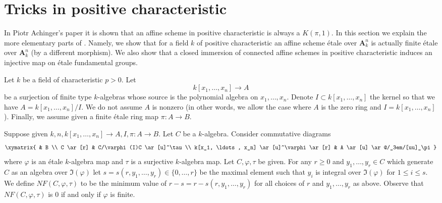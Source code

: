 \section{Tricks in positive characteristic}
\label{section-achinger}

\noindent
In Piotr Achinger's paper \cite{Achinger} it is shown that an
affine scheme in positive characteristic is always a $K(\pi, 1)$.
In this section we explain the more elementary parts of \cite{Achinger}.
Namely, we show that for a field $k$ of positive characteristic
an affine scheme \'etale over $\mathbf{A}^n_k$ is actually finite \'etale
over $\mathbf{A}^n_k$ (by a different morphism). We also show
that a closed immersion of connected affine schemes
in positive characteristic induces an injective map on
\'etale fundamental groups.

\medskip\noindent
Let $k$ be a field of characteristic $p > 0$.
Let
$$
k[x_1, \ldots, x_n] \longrightarrow A
$$
be a surjection of finite type $k$-algebras whose source is the
polynomial algebra on $x_1, \ldots, x_n$. Denote
$I \subset k[x_1, \ldots, x_n]$ the kernel so that we have
$A = k[x_1, \ldots, x_n]/I$. We do not assume $A$ is nonzero
(in other words, we allow the case where $A$ is the zero ring
and $I = k[x_1, \ldots, x_n]$). Finally, we assume given a
finite \'etale ring map $\pi : A \to B$.

\medskip\noindent
Suppose given $k, n, k[x_1, \ldots, x_n] \to A, I, \pi : A \to B$.
Let $C$ be a $k$-algebra. Consider
commutative diagrams
$$
\xymatrix{
& B \\
C \ar[r] & C/\varphi(I)C \ar[u]^\tau \\
k[x_1, \ldots, x_n] \ar[u]^\varphi \ar[r] &
A \ar[u] \ar@/_3em/[uu]_\pi
}
$$
where $\varphi$ is an \'etale $k$-algebra map and $\tau$ is a
surjective $k$-algebra map.
Let $C, \varphi, \tau$ be given. For any $r \geq 0$ and
$y_1, \ldots, y_r \in C$ which generate $C$ as an algebra over
$\Im(\varphi)$ let $s = s(r, y_1, \ldots, y_r) \in \{0, \ldots, r\}$
be the maximal element such that $y_i$ is integral over $\Im(\varphi)$
for $1 \leq i \leq s$. We define $NF(C, \varphi, \tau)$
to be the minimum value of
$r - s = r - s(r, y_1, \ldots, y_r)$ for all choices of
$r$ and $y_1, \ldots, y_r$ as above.
Observe that $NF(C, \varphi, \tau)$ is $0$ if and only if $\varphi$ is finite.

